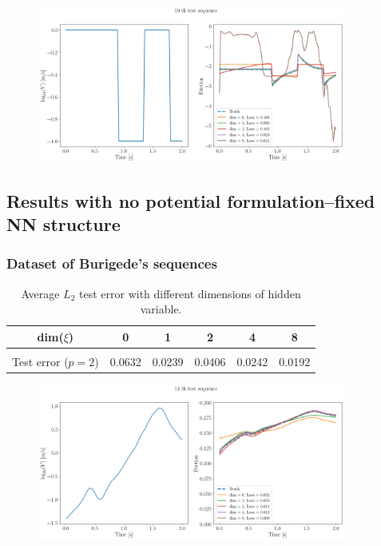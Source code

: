 \begin{figure}[H]
    \centering
    \includegraphics[width=0.9\textwidth]{images/dtTSqJump2_fixed.png}
    \label{fig:dtTSqJump2Fixed}
\end{figure}

\subsection{Results with no potential formulation--fixed NN structure}
\subsubsection{Dataset of Burigede's sequences}
\begin{table}[H]
    \centering
    \begin{tabular}{c|ccccc}
        \hline
        dim($\xi$) & 0 & 1 & 2 & 4 & 8 \\
        \hline \\[-1em]
        Test error ($p=2$) & 0.0632 & 0.0239 & 0.0406 & 0.0242 & 0.0192\\
        \hline
    \end{tabular}
    \caption{Average $L_2$ test error with different dimensions of hidden variable.}
    \label{tab:resFGBurigedeFixed}
\end{table}

\begin{figure}[H]
    \centering
    \includegraphics[width=0.9\textwidth]{images/FGBurigede1_fixed.png}
    \label{fig:FGBurigede1Fixed}
\end{figure}

